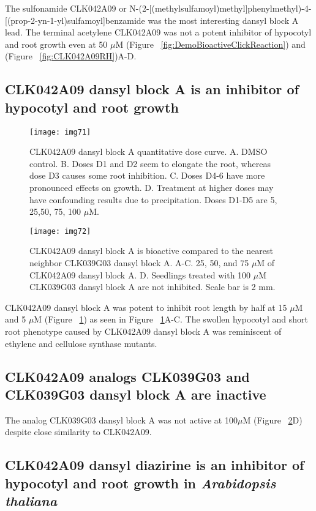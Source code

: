The sulfonamide CLK042A09 or N-({2-[(methylsulfamoyl)methyl]phenyl}methyl)-4-[(prop-2-yn-1-yl)sulfamoyl]benzamide was the most interesting dansyl block A lead. The terminal acetylene CLK042A09 was not a potent inhibitor of hypocotyl and root growth even at 50 $\mu$M (Figure ~\ref{fig:DemoBioactiveClickReaction}) and (Figure ~\ref{fig:CLK042A09RH})A-D. 

\subsection{CLK042A09 dansyl block A is an inhibitor of hypocotyl and root growth}

\begin{figure}
\centering
\texttt{[image: img71]}
\caption{CLK042A09 dansyl block A quantitative dose curve. A. DMSO control. B. Doses D1 and D2 seem to elongate the root, whereas dose D3 causes some root inhibition. C. Doses D4-6 have more pronounced effects on growth. D. Treatment at higher doses may have confounding results due to precipitation. Doses D1-D5 are 5, 25,50, 75, 100 $\mu$M.}
\label{fig:CLK042A09D}
\end{figure}

\begin{figure}
\texttt{[image: img72]}
\caption{CLK042A09 dansyl block A is bioactive compared to the nearest neighbor CLK039G03 dansyl block A. A-C. 25, 50, and 75 $\mu$M of CLK042A09 dansyl block A. D. Seedlings treated with 100 $\mu$M CLK039G03 dansyl block A are not inhibited. Scale bar is 2 mm.}
\label{fig:CLK042A09DoseCurvePretty}
\end{figure}

CLK042A09 dansyl block A was potent to inhibit root length by half at 15 $\mu$M and 5 $\mu$M (Figure ~\ref{fig:CLK042A09D}) as seen in Figure ~\ref{fig:CLK042A09D}A-C. The swollen hypocotyl and short root phenotype caused by CLK042A09 dansyl block A was reminiscent of ethylene and cellulose synthase mutants. 

\subsection{CLK042A09 analogs CLK039G03 and CLK039G03 dansyl block A are inactive}

The analog CLK039G03 dansyl block A was not active at 100$\mu$M (Figure ~\ref{fig:CLK042A09DoseCurvePretty}D) despite close similarity to CLK042A09. %

\subsection{CLK042A09 dansyl diazirine is an inhibitor of hypocotyl and root growth in {\it Arabidopsis thaliana}}

